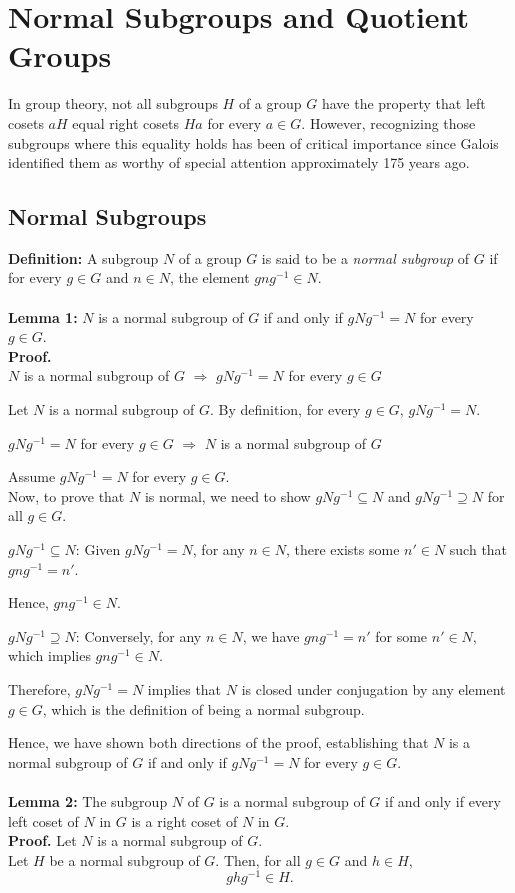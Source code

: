 \chapter{Normal Subgroups and Quotient Groups}
In group theory, not all subgroups $H$ of a group $G$ have the property that left cosets $aH$ equal right cosets $Ha$ for every $a \in G$. However, recognizing those subgroups where this equality holds has been of critical importance since Galois identified them as worthy of special attention approximately 175 years ago.
\section{Normal Subgroups}
\textbf{Definition: } A subgroup $N$ of a group $G$ is said to be a \textit{normal subgroup} of $G$ if for every $g \in G$ and $n \in N$, the element $gng^{-1} \in N$.
\\\\
\textbf{Lemma 1:} $N$ is a normal subgroup of $G$ if and only if $gNg^{-1} = N$ for every $g \in G$.
\\
\textbf{Proof.}
\\
 \( N \) is a normal subgroup of \( G \) \( \Rightarrow \) \( gNg^{-1} = N \) for every \( g \in G \)

Let \( N \) is a normal subgroup of \( G \). By definition, for every \( g \in G \), \( gNg^{-1} = N \).

\( gNg^{-1} = N \) for every \( g \in G \) \( \Rightarrow \) \( N \) is a normal subgroup of \( G \)

Assume \( gNg^{-1} = N \) for every \( g \in G \).\\
Now, to prove that \( N \) is normal, we need to show \( gNg^{-1} \subseteq N \) and \( gNg^{-1} \supseteq N \) for all \( g \in G \).

\( gNg^{-1} \subseteq N \): Given \( gNg^{-1} = N \), for any \( n \in N \), there exists some \( n' \in N \) such that \( gng^{-1} = n' \). 

Hence, \( gng^{-1} \in N \).
  
\( gNg^{-1} \supseteq N \): Conversely, for any \( n \in N \), we have \( gng^{-1} = n' \) for some \( n' \in N \), which implies \( gng^{-1} \in N \).


Therefore, \( gNg^{-1} = N \) implies that \( N \) is closed under conjugation by any element \( g \in G \), which is the definition of being a normal subgroup.

Hence, we have shown both directions of the proof, establishing that \( N \) is a normal subgroup of \( G \) if and only if \( gNg^{-1} = N \) for every \( g \in G \).
\\\\
\textbf{Lemma 2: }The subgroup \( N \) of \( G \) is a normal subgroup of \( G \) if and only if every left coset of \( N \) in \( G \) is a right coset of \( N \) in \( G \).\\
\textbf{Proof.} Let \( N \) is a normal subgroup of \( G \). \\
Let \( H \) be a normal subgroup of \( G \). Then, for all \( g \in G \) and \( h \in H \),
\[ ghg^{-1} \in H. \]

